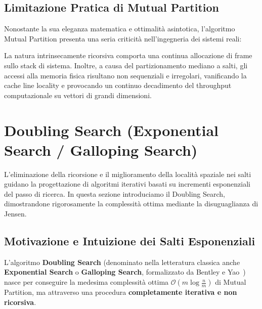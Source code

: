 \FloatBarrier
\subsection{Limitazione Pratica di Mutual Partition}
Nonostante la sua eleganza matematica e ottimalità asintotica, l'algoritmo Mutual Partition presenta una seria criticità nell'ingegneria dei sistemi reali:
\begin{center}
\end{center}
La natura intrinsecamente ricorsiva comporta una continua allocazione di frame sullo stack di sistema. Inoltre, a causa del partizionamento mediano a salti, gli accessi alla memoria fisica risultano non sequenziali e irregolari, vanificando la cache line locality e provocando un continuo decadimento del throughput computazionale su vettori di grandi dimensioni.

\FloatBarrier
\section{Doubling Search (Exponential Search / Galloping Search)}
\label{sec:doubling-search}

L'eliminazione della ricorsione e il miglioramento della localit\`a spaziale nei salti guidano la progettazione di algoritmi iterativi basati su incrementi esponenziali del passo di ricerca. In questa sezione introduciamo il Doubling Search, dimostrandone rigorosamente la complessit\`a ottima mediante la disuguaglianza di Jensen.

\FloatBarrier
\subsection{Motivazione e Intuizione dei Salti Esponenziali}
L'algoritmo \textbf{Doubling Search} (denominato nella letteratura classica anche \textbf{Exponential Search} o \textbf{Galloping Search}, formalizzato da Bentley e Yao~\cite{bentley1976}) nasce per conseguire la medesima complessità ottima $\mathcal{O}(m \log \frac{n}{m})$ di Mutual Partition, ma attraverso una procedura \textbf{completamente iterativa e non ricorsiva}.

